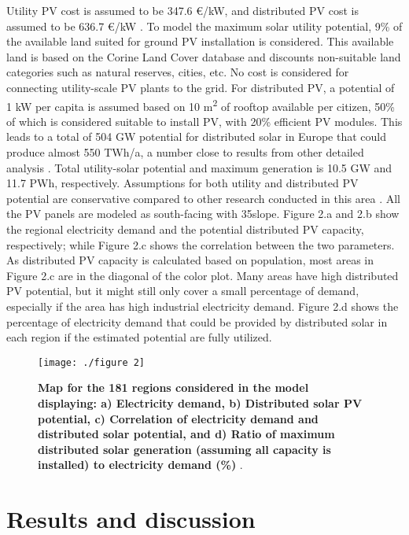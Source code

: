 \documentclass[review]{elsarticle}
\begin{document}
	Utility PV cost is assumed to be 347.6 €/kW, and distributed PV cost is assumed to be 636.7 €/kW \cite{DEA_2020}. To model the maximum solar utility potential, 9\% of the available land suited for ground PV installation is considered. This available land is based on the Corine Land Cover database and discounts non-suitable land categories such as natural reserves, cities, etc. No cost is considered for connecting utility-scale PV plants to the grid. For distributed PV, a potential of 1 kW per capita is assumed based on 10 m\textsuperscript{2} of rooftop available per citizen, 50\% of which is considered suitable to install PV, with 20\% efficient PV modules. This leads to a total of 504 GW potential for distributed solar in Europe that could produce almost 550 TWh/a, a number close to results from other detailed analysis \cite{huld_2018,bodis_2019}. Total utility-solar potential and maximum generation is 10.5 GW and 11.7 PWh, respectively. Assumptions for both utility and distributed PV potential are conservative compared to other research conducted in this area \cite{trondle_2019}. All the PV panels are modeled as south-facing with 35\degree  slope. Figure 2.a and 2.b show the regional electricity demand and the potential distributed PV capacity, respectively; while Figure 2.c shows the correlation between the two parameters. As distributed PV capacity is calculated based on population, most areas in Figure 2.c are in the diagonal of the color plot. Many areas have high distributed PV potential, but it might still only cover a small percentage of demand, especially if the area has high industrial electricity demand. Figure 2.d shows the percentage of electricity demand that could be provided by distributed solar in each region if the estimated potential are fully utilized. 
	
	\begin{figure}[!htb]
		\texttt{[image: ./figure 2]}
		\caption{\textbf{Map for the 181 regions considered in the model displaying: a) Electricity demand, b) Distributed solar PV potential, c) Correlation of electricity demand and distributed solar potential, and d) Ratio of maximum distributed solar generation (assuming all capacity is installed) to electricity demand (\%)} .}
		\label{fig:demand/capacity}
	\end{figure}
	
	
	\section{Results and discussion}
	
\end{document}
